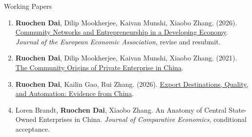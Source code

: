 \documentclass{resume} %
\begin{document}
\begin{rSection}{Working Papers}
\begin{enumerate}
\item \textbf{Ruochen Dai}, Dilip Mookherjee, Kaivan Munshi, Xiaobo Zhang. (2026). \href{https://ruochendai-econ.github.io/papers/community-networks.pdf}{Community Networks and Entrepreneurship in a Developing Economy}. \emph{Journal of the European Economic Association}, revise and resubmit.

\item \textbf{Ruochen Dai}, Dilip Mookherjee, Kaivan Munshi, Xiaobo Zhang. (2021). \href{https://ruochendai-econ.github.io/papers/community-origins.pdf}{The Community Origins of Private Enterprise in China}.

\item \textbf{Ruochen Dai}, Kailin Gao, Rui Zhang. (2026). \href{https://ruochendai-econ.github.io/papers/export-automation.pdf}{Export Destinations, Quality, and Automation: Evidence from China}.

\item Loren Brandt, \textbf{Ruochen Dai}, Xiaobo Zhang. An Anatomy of Central State-Owned Enterprises in China. \emph{Journal of Comparative Economics}, conditional acceptance.
\end{enumerate}
\end{rSection}
\end{document}
